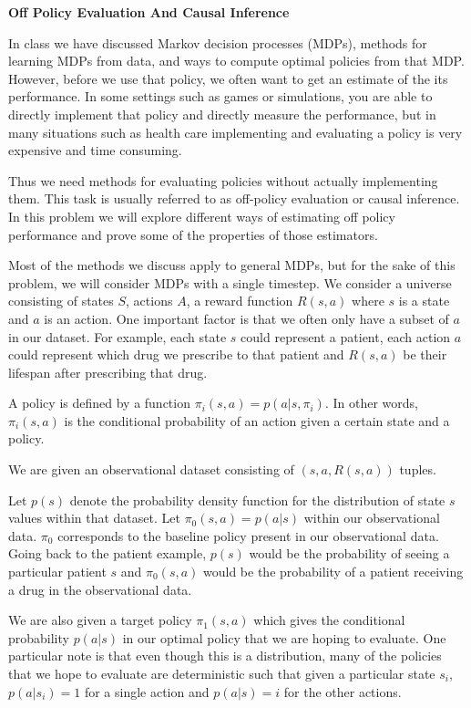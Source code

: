 \clearpage
\item {} {\bf Off Policy Evaluation And Causal Inference}

In class we have discussed Markov decision processes (MDPs), methods for learning MDPs from data, and ways to compute optimal policies from that MDP. However, before we use that policy, we often want to get an estimate of the its performance. In some settings such as games or simulations, you are able to directly implement that policy and directly measure the performance, but in many situations such as health care implementing and evaluating a policy is very expensive and time consuming.

Thus we need methods for evaluating policies without actually implementing them. This task is usually referred to as off-policy evaluation or causal inference. In this problem we will explore different ways of estimating off policy performance and prove some of the properties of those estimators.

Most of the methods we discuss apply to general MDPs, but for the sake of this problem, we will consider MDPs with a single timestep. We consider a universe consisting of states $S$, actions $A$, a reward function $R(s, a)$ where $s$ is a state and $a$ is an action. One important factor is that we often only have a subset of $a$ in our dataset. For example, each state $s$ could represent a patient, each action $a$ could represent which drug we prescribe to that patient and $R(s, a)$ be their lifespan after prescribing that drug.

A policy is defined by a function $\pi_i(s, a) = p(a | s, \pi_i)$. In other words, $\pi_i(s, a)$ is the conditional probability of an action given a certain state and a policy.

We are given an observational dataset consisting of $(s, a, R(s, a))$ tuples. 

Let $p(s)$ denote the probability density function for the distribution of state $s$ values within that dataset. Let $\pi_0(s, a) =  p(a | s)$ within our observational data. $\pi_0$ corresponds to the baseline policy present in our observational data. Going back to the patient example, $p(s)$ would be the probability of seeing a particular patient $s$ and $\pi_0(s, a)$ would be the probability of a patient receiving a drug in the observational data. 

We are also given a target policy $\pi_1(s, a)$ which gives the conditional probability $p(a | s)$ in our optimal policy that we are hoping to evaluate. One particular note is that even though this is a distribution, many of the policies that we hope to evaluate are deterministic such that given a particular state $s_i$, $p(a | s_i) = 1$ for a single action and $p(a | s) = i$ for the other actions.

